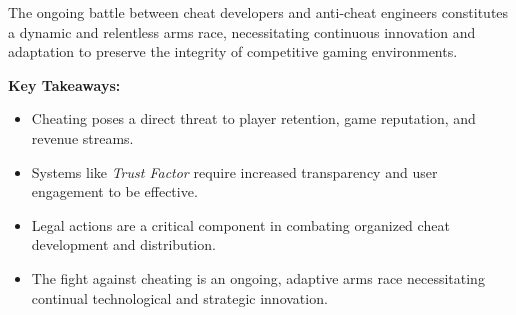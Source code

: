 The ongoing battle between cheat developers and anti-cheat engineers constitutes a dynamic and relentless arms race, necessitating continuous innovation and adaptation to preserve the integrity of competitive gaming environments.

\vspace{1em}

\begin{tcolorbox}[colback=gray!10, colframe=gray!50, boxrule=0pt, sharp corners, width=\linewidth, left=1mm, right=1mm, top=0.5mm, bottom=0.5mm]
\textbf{Key Takeaways:}
\begin{itemize}
    \item Cheating poses a direct threat to player retention, game reputation, and revenue streams.
    \item Systems like \textit{Trust Factor} require increased transparency and user engagement to be effective.
    \item Legal actions are a critical component in combating organized cheat development and distribution.
    \item The fight against cheating is an ongoing, adaptive arms race necessitating continual technological and strategic innovation.
\end{itemize}
\end{tcolorbox}
